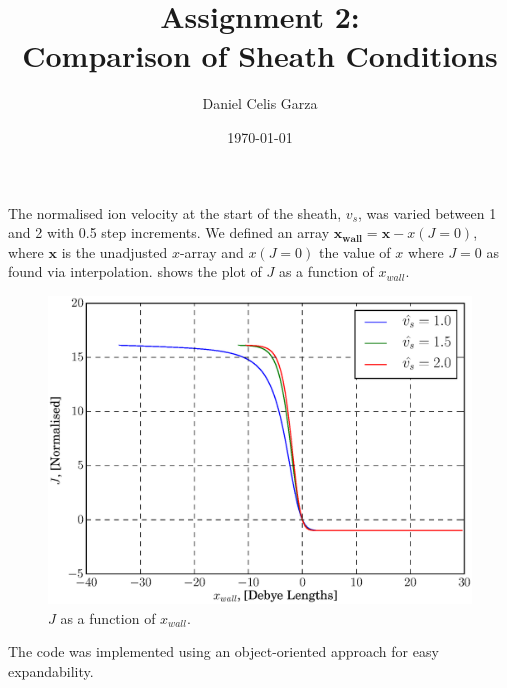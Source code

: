 \documentclass[10pt,a4paper]{article}
\begin{document}
	\title{Assignment 2:\\Comparison of Sheath Conditions}
	\author{Daniel Celis Garza}
	\date{\today}
	\maketitle
	
	The normalised ion velocity at the start of the sheath, $v_{s}$, was varied between 1 and 2 with 0.5 step increments. We defined an array $\mathbf{x_{wall}} = \mathbf{x} - x(J=0)$, where $\mathbf{x}$ is the unadjusted $x$-array and $x(J=0)$ the value of $x$ where $J=0$ as found via interpolation.  shows the plot of $J$ as a function of $x_{wall}$.
	\begin{figure}[H]
		\includegraphics[width=\textwidth]{changevs.eps}
		\caption{$J$ as a function of $x_{wall}$.}\label{fig:1}
	\end{figure}
	
	The code was implemented using an object-oriented approach for easy expandability.
	\inputminted[linenos = true,
				 breaklines, 
				 breakanywhere]{python}{dcg513_2.py}
\end{document}
